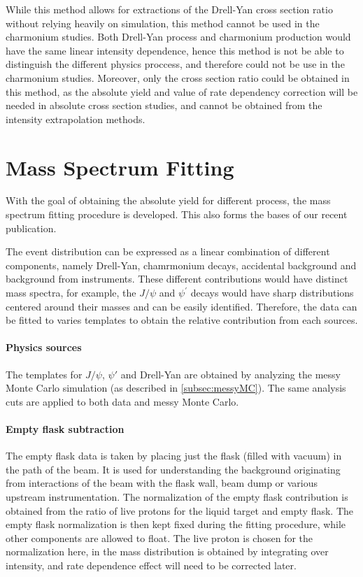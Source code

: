 \documentclass[../main.tex]{subfiles}
\begin{document}


While this method allows for extractions of the Drell-Yan cross section ratio without relying
heavily on simulation, this method cannot be used in the charmonium studies.
Both Drell-Yan process and charmonium production would have the same linear intensity dependence,
hence this method is not be able to distinguish the different physics proccess, and therefore could
not be use in the charmonium studies. Moreover, only the cross section ratio could be obtained in
this method, as the absolute yield and value of rate dependency correction will be needed in
absolute cross section studies, and cannot be obtained from the intensity extrapolation methods.

\section{Mass Spectrum Fitting}
With the goal of obtaining the absolute yield for different process, the mass spectrum fitting
procedure is developed. This also forms the bases of our recent publication\cite{dove2023}.

The event distribution can be expressed as a linear combination of different components,
namely Drell-Yan, chamrmonium decays, accidental background and background from instruments.
These different contributions would have distinct mass spectra, for example, the $J/\psi$
and $\psi^\prime$ decays would have sharp distributions centered around their masses and
can be easily identified. Therefore, the data can be fitted to varies templates to obtain
the relative contribution from each sources.

\paragraph{Physics sources}
The templates for $J/\psi$, $\psi'$ and Drell-Yan are obtained by analyzing the messy Monte Carlo
simulation (as described in \cref{subsec:messyMC}). The same analysis cuts are applied to both data
and messy Monte Carlo. 

\paragraph{Empty flask subtraction}
The empty flask data is taken by placing just the flask (filled with vacuum) in the path of
the beam. It is used for understanding the background originating from interactions of the beam
with the flask wall, beam dump or various upstream instrumentation. The normalization of the
empty flask contribution is obtained from the ratio of live protons for the liquid target and
empty flask. The empty flask normalization is then kept fixed during the fitting procedure, while
other components are allowed to float. The live proton is chosen for the normalization here, in the 
mass distribution is obtained by integrating over intensity, and rate dependence effect will need
to be corrected later.
\end{document}
